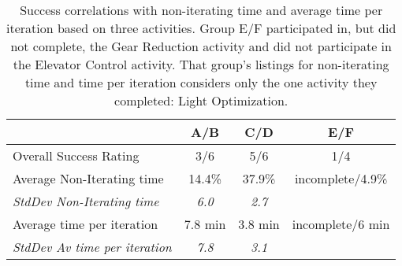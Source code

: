 \begin{table}
\begin{centering}
\begin{tabular}{l c c c}
	\toprule
							& A/B 	& C/D	& E/F	\\ \midrule
	Overall Success Rating          	& 3/6		& 5/6 		& 1/4		\\ \midrule
	Average Non-Iterating time 	& 14.4\%	& 37.9\%	& incomplete/4.9\% 	\\ \midrule
	\emph{StdDev Non-Iterating time}	& \emph{6.0}	& \emph{2.7}	& 					\\ \midrule
	Average time per iteration 	& 7.8 min & 3.8 min & incomplete/6 min \\ \midrule
	\emph{StdDev Av time per iteration}	& \emph{7.8}	& \emph{3.1}	& 					\\ 
	\bottomrule
\end{tabular}
\caption[Correlations of success to iteration time.]{Success correlations with non-iterating time and average time per iteration based on three activities. Group E/F participated in, but did not complete, the Gear Reduction activity and did not participate in the Elevator Control activity. That group's listings for non-iterating time and time per iteration considers only the one activity they completed: Light Optimization. }
\label{tab:success-correlations}
\end{centering}
\end{table}


